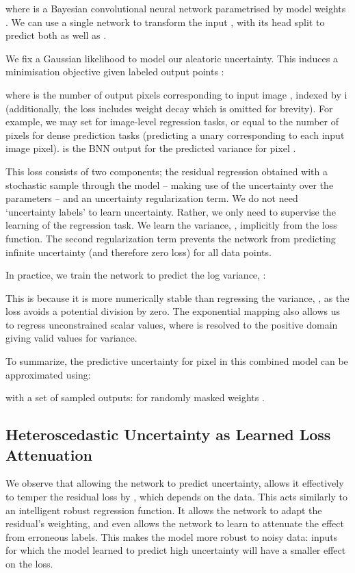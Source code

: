 \documentclass{article}
\begin{document}
where  is a Bayesian convolutional neural network parametrised by model weights . We can use a single network to transform the input , with its head split to predict both  as well as .

We fix a Gaussian likelihood to model our aleatoric uncertainty.
This induces a minimisation objective given labeled output points :

where  is the number of output pixels  corresponding to input image , indexed by i (additionally, the loss includes weight decay which is omitted for brevity). For example, we may set  for image-level regression tasks, or  equal to the number of pixels for dense prediction tasks (predicting a unary corresponding to each input image pixel).  is the BNN output for the predicted variance for pixel .

This loss consists of two components; the residual regression obtained with a stochastic sample through the model -- making use of the uncertainty over the parameters  -- and an uncertainty regularization term. We do not need `uncertainty labels' to learn uncertainty. Rather, we only need to supervise the learning of the regression task. We learn the variance, , implicitly from the loss function. The second regularization term prevents the network from predicting infinite uncertainty (and therefore zero loss) for all data points.

In practice, we train the network to predict the log variance, : 

This is because it is more numerically stable than regressing the variance, , as the loss avoids a potential division by zero. The exponential mapping also allows us to regress unconstrained scalar values, where  is resolved to the positive domain giving valid values for variance.

To summarize, the predictive uncertainty for pixel  in this combined model can be approximated using:

with  a set of  sampled outputs:  for randomly masked weights .


\subsection{Heteroscedastic Uncertainty as Learned Loss Attenuation}

We observe that allowing the network to predict uncertainty, allows it effectively to temper the residual loss by , which depends on the data. This acts similarly to an intelligent robust regression function. It allows the network to adapt the residual's weighting, and even allows the network to learn to attenuate the effect from erroneous labels. This makes the model more robust to noisy data: inputs for which the model learned to predict high uncertainty will have a smaller effect on the loss.
\end{document}
